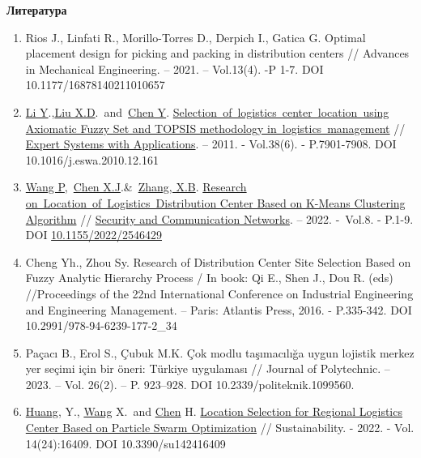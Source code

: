 {\bfseries Литература}

\begin{enumerate}
\def\labelenumi{\arabic{enumi}.}
\item
  Rios J., Linfati R., Morillo-Torres D., Derpich I., Gatica G. Optimal
  placement design for picking and packing in distribution centers //
  Advances in Mechanical Engineering. -- 2021. -- Vol.13(4). -P 1-7. DOI
  10.1177/16878140211010657
\item
  \href{https://www.webofscience.com/wos/author/record/28556133}{Li
  Y}.,\href{https://www.webofscience.com/wos/author/record/32561100}{Liu
  X.D}.~and~\href{https://www.webofscience.com/wos/author/record/6098832}{Chen
  Y}.
  \href{https://www.webofscience.com/wos/woscc/full-record/WOS:000288343900166}{Selection~of~logistics~center~location~using
  Axiomatic Fuzzy Set and TOPSIS methodology in~logistics~management} //
  \href{https://www.sciencedirect.com/journal/expert-systems-with-applications}{Expert
  Systems with Applications}. -- 2011. - Vol.38(6). - P.7901-7908. DOI
  10.1016/j.eswa.2010.12.161
\item
  \href{https://www.webofscience.com/wos/author/record/14795379}{Wang
  P},~\href{https://www.webofscience.com/wos/author/record/36107182}{Chen
  X.J}.\&~\href{https://www.webofscience.com/wos/author/record/32493117}{Zhang,
  X.B}.
  \href{https://www.webofscience.com/wos/woscc/full-record/WOS:000830775300005}{Research
  on~Location~of~Logistics~Distribution Center Based on K-Means
  Clustering Algorithm} //
  \href{https://www.researchgate.net/journal/Security-and-Communication-Networks-1939-0122}{Security
  and Communication Networks}. -- 2022. -~Vol.8. - P.1-9. DOI
  \href{http://dx.doi.org/10.1155/2022/2546429}{10.1155/2022/2546429}
\item
  Cheng Yh., Zhou Sy. Research of Distribution Center Site Selection
  Based on Fuzzy Analytic Hierarchy Process / In book: Qi E., Shen J.,
  Dou R. (eds) //Proceedings of the 22nd International Conference on
  Industrial Engineering and Engineering Management. -- Paris: Atlantis
  Press, 2016. - P.335-342. DOI 10.2991/978-94-6239-177-2\_34
\item
  Paçacı B., Erol S., Çubuk M.K. Çok modlu taşımacılığa uygun lojistik
  merkez yer seçimi için bir öneri: Türkiye uygulaması // Journal of
  Polytechnic. -- 2023. -- Vol. 26(2). -- P. 923--928. DOI
  10.2339/politeknik.1099560.
\item
  \href{https://sciprofiles.com/profile/693277}{Huang}, Y.,
  \href{https://sciprofiles.com/profile/2635021}{Wang} X.~and
  \href{https://sciprofiles.com/profile/author/dFBVb3FoaXR6WVFmWlV5M0h1dGNXZz09}{Chen}
  H. \href{https://www.mdpi.com/2071-1050/14/24/16409}{Location
  Selection for Regional Logistics Center Based on Particle Swarm
  Optimization} // Sustainability. - 2022. - Vol. 14(24):16409. DOI
  10.3390/su142416409
\end{enumerate}

